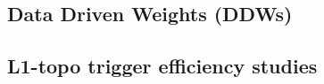 



\subsection{Data Driven Weights (DDWs)}
\label{sec:DDWs}




\subsection{L1-topo trigger efficiency studies}

